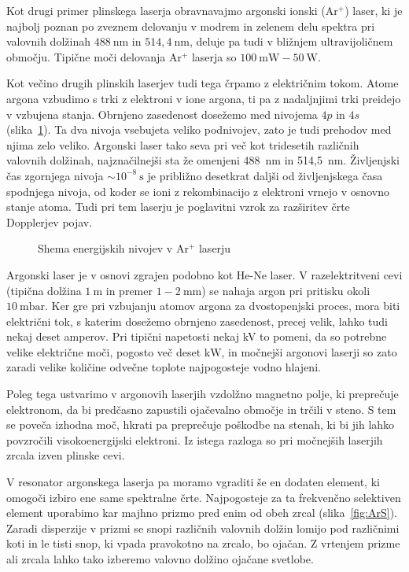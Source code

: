 Kot drugi primer plinskega laserja obravnavajmo argonski ionski (Ar$^+$) laser,
ki je najbolj poznan po zveznem delovanju v modrem in zelenem delu spektra pri 
valovnih dolžinah $488~\si{\nano\metre}$ in $514,4~\si{\nano\metre}$, deluje 
pa tudi v bližnjem ultravijoličnem območju. Tipične moči delovanja Ar$^+$ laserja
so $100~\si{\milli\watt} - 50~\si{\watt}$.

Kot večino drugih plinskih laserjev tudi tega črpamo z električnim tokom.
Atome argona vzbudimo s trki z elektroni v ione argona, ti pa z nadaljnjimi
trki preidejo v vzbujena stanja. Obrnjeno zasedenost
dosežemo med nivojema $4p$ in $4s$ (slika~\ref{fig:ArE}). 
Ta dva nivoja vsebujeta veliko podnivojev, zato je tudi prehodov med
njima zelo veliko. Argonski laser tako seva pri več kot tridesetih različnih
valovnih dolžinah, najznačilnejši sta že omenjeni 488~nm in 514,5~nm. 
Življenjski čas zgornjega nivoja $\sim 10^{-8}~\si{\second}$ je približno 
desetkrat daljši od življenjskega časa spodnjega nivoja, od koder se ioni
z rekombinacijo z elektroni vrnejo v osnovno stanje atoma. Tudi pri tem laserju
je poglavitni vzrok za razširitev črte Dopplerjev pojav. 

\begin{figure}[h]
\centering
\def\svgwidth{80truemm} 

\caption{Shema energijskih nivojev v Ar$^+$ laserju}
\label{fig:ArE}
\end{figure}

Argonski laser je v osnovi zgrajen podobno kot He-Ne laser. V razelektritveni cevi
(tipična dolžina $1~\si{\metre}$ in premer $1-2~\si{\milli\metre}$)
se nahaja argon pri pritisku okoli $10~\si{\milli\bar}$. Ker gre pri 
vzbujanju atomov argona za dvostopenjski proces, mora biti električni tok, 
s katerim dosežemo obrnjeno zasedenost, precej velik, lahko tudi nekaj deset amperov. 
Pri tipični napetosti nekaj kV to pomeni, da so potrebne velike električne moči, 
pogosto več deset $\si{\kilo\watt}$, in močnejši argonovi laserji so zato zaradi 
velike količine odvečne toplote najpogosteje vodno hlajeni.

Poleg tega ustvarimo v argonovih laserjih vzdolžno magnetno polje, ki preprečuje 
elektronom, da bi predčasno zapustili ojačevalno območje in trčili v steno. S
tem se poveča izhodna moč, hkrati pa preprečuje poškodbe na stenah, ki bi jih 
lahko povzročili visokoenergijski elektroni. Iz istega razloga so pri močnejših
laserjih zrcala izven plinske cevi. 

V resonator argonskega laserja pa moramo vgraditi še en dodaten element, ki omogoči
izbiro ene same spektralne črte. Najpogosteje za ta frekvenčno selektiven element
uporabimo kar majhno prizmo pred enim od obeh zrcal (slika~\ref{fig:ArS}). Zaradi disperzije
v prizmi se snopi različnih valovnih dolžin lomijo pod različnimi koti in le tisti 
snop, ki vpada pravokotno na zrcalo, bo ojačan. Z vrtenjem prizme ali zrcala lahko 
tako izberemo valovno dolžino ojačane svetlobe.

